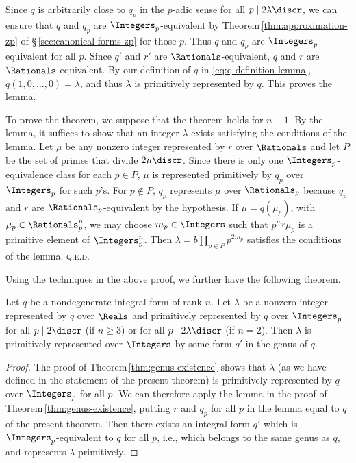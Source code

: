 Since \(q\) is arbitrarily close to \(q_p\) in the \(p\)-adic sense for all \(p \mid 2 \lambda \discr\), we can ensure that \(q\) and \(q_p\) are \(\Integers_p\)-equivalent by Theorem\,\ref{thm:approximation-zp} of \S\,\ref{sec:canonical-forms-zp} for those \(p\). Thus \(q\) and \(q_p\) are \(\Integers_p\)-equivalent for all \(p\). Since \(q'\) and \(r'\) are \(\Rationals\)-equivalent, \(q\) and \(r\) are \(\Rationals\)-equivalent. By our definition of \(q\) in \eqref{eq:q-definition-lemma}, \(q(1,0,\dots, 0) = \lambda\), and thus \(\lambda\) is primitively represented by \(q\). This proves the lemma.

\medskip

To prove the theorem, we suppose that the theorem holds for \(n - 1\). By the lemma, it suffices to show that an integer \(\lambda\) exists satisfying the conditions of the lemma. Let \(\mu\) be any nonzero integer represented by \(r\) over \(\Rationals\) and let \(P\) be the set of primes that divide \(2\mu\discr\). Since there is only one \(\Integers_p\)-equivalence class for each \(p \in P\), \(\mu\) is represented primitively by \(q_p\) over \(\Integers_p\) for such \(p\)'s. For \(p \notin P\), \(q_p\) represents \(\mu\) over \(\Rationals_p\) because \(q_p\) and \(r\) are \(\Rationals_p\)-equivalent by the hypothesis. If \(\mu = q(\mu_p)\), with \(\mu_p \in \Rationals_p^n\), we may choose \(m_p \in \Integers\) such that \(p^{m_p}\mu_p\) is a primitive element of \(\Integers_p^n\). Then \(\lambda = b \prod_{p \in P} p^{2m_p}\) satisfies the conditions of the lemma. {\scshape q.e.d.}

\medskip

Using the techniques in the above proof, we further have the following theorem.

\begin{theoremx}\label{thm:genus-existence-2}
    {\normalfont \cite[p.\,143]{cassels2008rational}}
    Let \(q\) be a nondegenerate integral form of rank \(n\). Let \(\lambda\) be a nonzero integer represented by \(q\) over \(\Reals\) and primitively represented by \(q\) over \(\Integers_p\) for all \(p \mid 2\discr\) (if \(n \geq 3\)) or for all \(p \mid 2\lambda\discr\) (if \(n = 2\)). Then \(\lambda\) is primitively represented  over \(\Integers\) by some form \(q'\) in the genus of \(q\).
\end{theoremx}

\begin{proof}
    The proof of Theorem\,\ref{thm:genus-existence} shows that \(\lambda\) (as we have defined in the statement of the present theorem) is primitively represented by \(q\) over \(\Integers_p\) for all \(p\). We can therefore apply the lemma in the proof of Theorem\,\ref{thm:genus-existence}, putting \(r\) and \(q_p\) for all \(p\) in the lemma equal to \(q\) of the present theorem. Then there exists an integral form \(q'\) which is \(\Integers_p\)-equivalent to \(q\) for all \(p\), i.e., which belongs to the same genus as \(q\), and represents \(\lambda\) primitively.
\end{proof}

